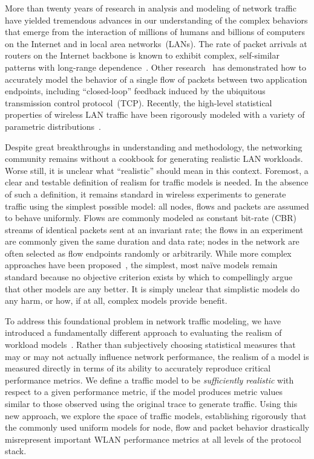 \documentclass[conference]{IEEEtran}
\newcommand{\caps}[1]{{\small{#1}}}
\begin{document}
More than twenty years of research in analysis and modeling of network traffic have yielded tremendous advances in our understanding of the complex behaviors that emerge from the interaction of millions of humans and billions of computers on the Internet and in local area networks~(\caps{LAN}s). The rate of packet arrivals at routers on the Internet backbone is known to exhibit complex, self-similar patterns with long-range dependence~\cite{Paxson95,Paxson96,Willinger98}. Other research~\cite{Hernandez06:dissertation} has demonstrated how to accurately model the behavior of a single flow of packets between two application endpoints, including ``closed-loop'' feedback induced by the ubiquitous transmission control protocol~(\caps{TCP}). Recently, the high-level statistical properties of wireless \caps{LAN} traffic have been rigorously modeled with a variety of parametric distributions~\cite{Hernandez06:wlan-traffic}.

Despite great breakthroughs in understanding and methodology, the networking community remains without a cookbook for generating realistic \caps{LAN} workloads. Worse still, it is unclear what ``realistic'' should mean in this context. Foremost, a clear and testable definition of realism for traffic models is needed. In the absence of such a definition, it remains standard in wireless experiments to generate traffic using the simplest possible model: all nodes, flows and packets are assumed to behave uniformly. Flows are commonly modeled as constant bit-rate (\caps{CBR}) streams of identical packets sent at an invariant rate; the flows in an experiment are commonly given the same duration and data rate; nodes in the network are often selected as flow endpoints randomly or arbitrarily. While more complex approaches have been proposed~\cite{Sommers04,Avallone04,Avallone06}, %
the simplest, most na\"ive models remain standard because no objective criterion exists by which to compellingly argue that other models are any better. It is simply unclear that simplistic models do any harm, or how, if at all, complex models provide benefit.

To address this foundational problem in network traffic modeling, we have introduced a fundamentally different approach to evaluating the realism of workload models~\cite{Karpinski07:realism,Karpinski07:cbr-failure}. Rather than subjectively choosing statistical measures that may or may not actually influence network performance, the realism of a model is measured directly in terms of its ability to accurately reproduce critical performance metrics. We define a traffic model to be \textit{sufficiently realistic} with respect to a given performance metric, if the model produces metric values similar to those observed using the original trace to generate traffic. Using this new approach, we explore the space of traffic models, establishing rigorously that the commonly used uniform models for node, flow and packet behavior drastically misrepresent important \caps{WLAN} performance metrics at all levels of the protocol stack.
\end{document}
